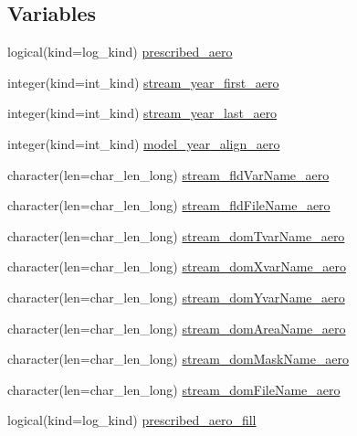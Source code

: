 \subsection*{Variables}
\begin{DoxyCompactItemize}
\item 
logical(kind=log\_\-kind) \hyperlink{namespaceice__prescaero__mod_a12fbaeed0ee95a72e9c96406be9d7578}{prescribed\_\-aero}
\item 
integer(kind=int\_\-kind) \hyperlink{namespaceice__prescaero__mod_a707a18c373ea6a3f7aa42d9a1872f322}{stream\_\-year\_\-first\_\-aero}
\item 
integer(kind=int\_\-kind) \hyperlink{namespaceice__prescaero__mod_ae0ffc599bd1d380d44541bac8026fc8d}{stream\_\-year\_\-last\_\-aero}
\item 
integer(kind=int\_\-kind) \hyperlink{namespaceice__prescaero__mod_a992cda048d40587ac16120bfa8691a42}{model\_\-year\_\-align\_\-aero}
\item 
character(len=char\_\-len\_\-long) \hyperlink{namespaceice__prescaero__mod_a92f0e6afee8f0fce04d39a9b726579c4}{stream\_\-fldVarName\_\-aero}
\item 
character(len=char\_\-len\_\-long) \hyperlink{namespaceice__prescaero__mod_a5528b5428fb89c7e220fc959f2c80009}{stream\_\-fldFileName\_\-aero}
\item 
character(len=char\_\-len\_\-long) \hyperlink{namespaceice__prescaero__mod_a73733a5cec61434d5a1da1d83629e601}{stream\_\-domTvarName\_\-aero}
\item 
character(len=char\_\-len\_\-long) \hyperlink{namespaceice__prescaero__mod_a6ba0f1529c78ceec4eb50dd637ee5a54}{stream\_\-domXvarName\_\-aero}
\item 
character(len=char\_\-len\_\-long) \hyperlink{namespaceice__prescaero__mod_a9e4fb440c2ad241c5a3d034e180fffef}{stream\_\-domYvarName\_\-aero}
\item 
character(len=char\_\-len\_\-long) \hyperlink{namespaceice__prescaero__mod_afc3d3f278ce9859e477534269596e82f}{stream\_\-domAreaName\_\-aero}
\item 
character(len=char\_\-len\_\-long) \hyperlink{namespaceice__prescaero__mod_a9ba2c680142ab95e945ff4071df68330}{stream\_\-domMaskName\_\-aero}
\item 
character(len=char\_\-len\_\-long) \hyperlink{namespaceice__prescaero__mod_a4b93709d4642b42b9af488601bef97f6}{stream\_\-domFileName\_\-aero}
\item 
logical(kind=log\_\-kind) \hyperlink{namespaceice__prescaero__mod_aa57981b6da9b30b28d73604e3a8b9851}{prescribed\_\-aero\_\-fill}

\end{DoxyCompactItemize}

